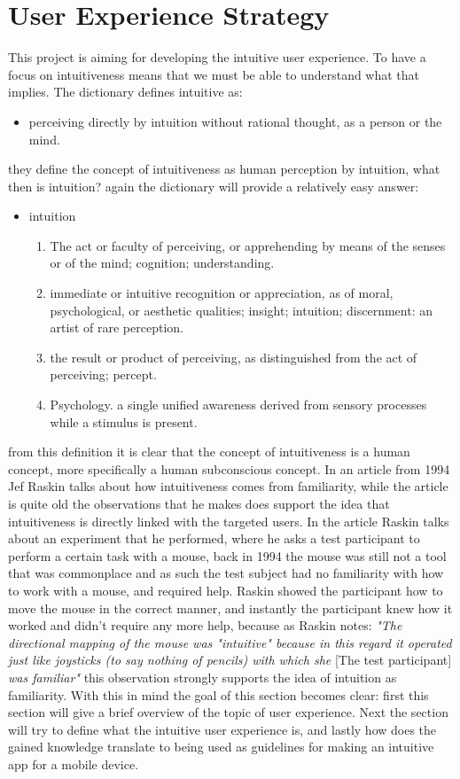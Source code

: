 \section{User Experience Strategy}
This project is aiming for developing the intuitive user experience. To have a 
focus on intuitiveness means that we must be able to understand what that 
implies. The dictionary defines intuitive as: 
\begin{itemize}
\item perceiving directly by intuition without rational thought, as a person or the mind.
\end{itemize}
they define the concept of intuitiveness as human perception by intuition, what 
then is intuition? again the dictionary will provide a relatively easy answer: 
\begin{itemize}
\item intuition\\
\begin{enumerate}
\item The act or faculty of perceiving, or apprehending by means of the senses or 
of the mind; cognition; understanding.
\item immediate or intuitive recognition or appreciation, as of moral, 
psychological, or aesthetic qualities; insight; intuition; discernment:
an artist of rare perception.
\item the result or product of perceiving, as distinguished from the act of 
perceiving; percept.
\item Psychology. a single unified awareness derived from sensory processes while 
a stimulus is present.
\end{enumerate}
\end{itemize} from this definition it is clear that the concept of intuitiveness is a human concept, more specifically a human subconscious concept. In an article 
from 1994 Jef Raskin\cite{JRaskin} talks about how intuitiveness comes from familiarity, while the article is quite old the observations that he makes does support the idea that intuitiveness is directly linked with the targeted users. 
In the article Raskin talks about an experiment that he performed, where he asks a test participant to perform a certain task with a mouse, back in 1994 the mouse 
was still not a tool that was commonplace and as such the test subject had no familiarity with how to work with a mouse, and required help. Raskin showed the 
participant how to move the mouse in the correct manner, and instantly the 
participant knew how it worked and didn't require any more help, because as 
Raskin notes: \textit{"The directional mapping of the mouse was "intuitive" 
because in this regard it operated just like joysticks (to say nothing of 
pencils) with which she} [The test participant] \textit{was familiar"}
\cite{JRaskin} this observation strongly supports the idea of intuition as 
familiarity. With this in mind the goal of this section becomes clear: first this 
section will give a brief overview of the topic of user experience. Next the 
section will try to define what the intuitive user experience is, and lastly how 
does the gained knowledge translate to being used as guidelines for making an 
intuitive app for a mobile device.  

